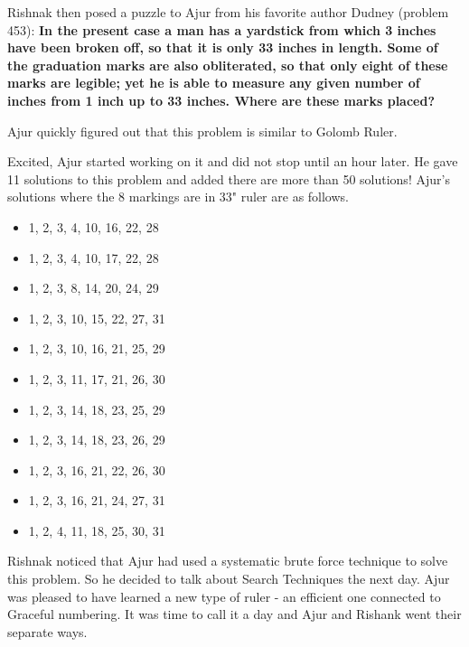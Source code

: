 Rishnak then posed a puzzle to Ajur from his favorite author Dudney (problem 453):
\textbf{In the present case a man has a yardstick from which 3 inches have
been broken off, so that it is only 33 inches in length. Some of the graduation
marks are also obliterated, so that only eight of these marks are legible; yet
he is able to measure any given number of inches from 1 inch up to 33 inches.
Where are these marks placed? }

Ajur quickly figured out that this problem is similar to Golomb Ruler. 

Excited, Ajur started working on it and did not stop until an hour later. He gave 11 solutions to this problem and added there are more than 50 solutions! Ajur's solutions where the 8 markings are in 33" ruler are as follows.
\begin{itemize}
    \item 1, 2, 3, 4, 10, 16, 22, 28
    \item 1, 2, 3, 4, 10, 17, 22,  28
    \item 1, 2, 3, 8, 14, 20, 24, 29
    \item 1, 2, 3, 10, 15, 22, 27, 31
    \item 1, 2, 3, 10, 16, 21, 25, 29
     \item 1, 2, 3, 11, 17, 21, 26, 30
     \item 1, 2, 3, 14, 18, 23, 25, 29
     \item 1, 2, 3, 14, 18, 23, 26, 29
     \item 1, 2, 3, 16, 21, 22, 26, 30
     \item 1, 2, 3, 16, 21, 24, 27, 31
     \item 1, 2, 4, 11, 18, 25, 30, 31
\end{itemize}
Rishnak noticed that Ajur had used a systematic brute force technique to solve this problem. So he decided to talk about Search Techniques the next day.
Ajur was pleased to have learned a new type of ruler - an efficient one connected to Graceful numbering. It was time to call it a day and Ajur and Rishank went their separate ways.